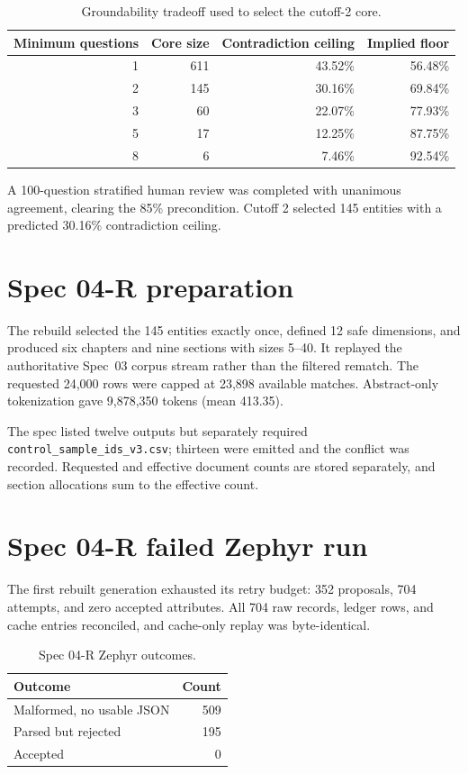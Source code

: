 \documentclass[11pt]{article}
\begin{document}
\begin{table}[h]
\centering
\begin{tabular}{rrrr}
\toprule
Minimum questions & Core size & Contradiction ceiling & Implied floor \\
\midrule
1 & 611 & 43.52\% & 56.48\% \\
2 & 145 & 30.16\% & 69.84\% \\
3 & 60  & 22.07\% & 77.93\% \\
5 & 17  & 12.25\% & 87.75\% \\
8 & 6   & 7.46\%  & 92.54\% \\
\bottomrule
\end{tabular}
\caption{Groundability tradeoff used to select the cutoff-2 core.}
\end{table}

A 100-question stratified human review was completed with unanimous agreement,
clearing the 85\% precondition. Cutoff 2 selected 145 entities with a predicted
30.16\% contradiction ceiling.

\section{Spec 04-R preparation}

The rebuild selected the 145 entities exactly once, defined 12 safe dimensions,
and produced six chapters and nine sections with sizes 5--40. It replayed the
authoritative Spec~03 corpus stream rather than the filtered rematch. The
requested 24,000 rows were capped at 23,898 available matches. Abstract-only
tokenization gave 9,878,350 tokens (mean 413.35).

The spec listed twelve outputs but separately required
\texttt{control\_sample\_ids\_v3.csv}; thirteen were emitted and the conflict
was recorded. Requested and effective document counts are stored separately,
and section allocations sum to the effective count.

\section{Spec 04-R failed Zephyr run}

The first rebuilt generation exhausted its retry budget: 352 proposals, 704
attempts, and zero accepted attributes. All 704 raw records, ledger rows, and
cache entries reconciled, and cache-only replay was byte-identical.

\begin{table}[h]
\centering
\begin{tabular}{lr}
\toprule
Outcome & Count \\
\midrule
Malformed, no usable JSON & 509 \\
Parsed but rejected & 195 \\
Accepted & 0 \\
\bottomrule
\end{tabular}
\caption{Spec 04-R Zephyr outcomes.}
\end{table}
\end{document}
